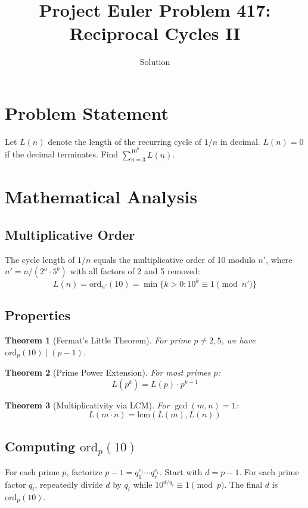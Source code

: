 \documentclass[12pt]{article}
\title{Project Euler Problem 417: Reciprocal Cycles II}
\author{Solution}
\date{}
\newtheorem{theorem}{Theorem}
\theoremstyle{definition}
\begin{document}
\maketitle

\section{Problem Statement}
Let $L(n)$ denote the length of the recurring cycle of $1/n$ in decimal. $L(n) = 0$ if the decimal terminates. Find $\sum_{n=3}^{10^8} L(n)$.

\section{Mathematical Analysis}

\subsection{Multiplicative Order}
The cycle length of $1/n$ equals the multiplicative order of 10 modulo $n'$, where $n' = n / (2^a \cdot 5^b)$ with all factors of 2 and 5 removed:
\[
L(n) = \mathrm{ord}_{n'}(10) = \min\{k > 0 : 10^k \equiv 1 \pmod{n'}\}
\]

\subsection{Properties}
\begin{theorem}[Fermat's Little Theorem]
For prime $p \neq 2, 5$, we have $\mathrm{ord}_p(10) \mid (p-1)$.
\end{theorem}

\begin{theorem}[Prime Power Extension]
For most primes $p$:
\[
L(p^k) = L(p) \cdot p^{k-1}
\]
\end{theorem}

\begin{theorem}[Multiplicativity via LCM]
For $\gcd(m,n) = 1$:
\[
L(m \cdot n) = \mathrm{lcm}(L(m), L(n))
\]
\end{theorem}

\subsection{Computing $\mathrm{ord}_p(10)$}
For each prime $p$, factorize $p-1 = q_1^{e_1} \cdots q_r^{e_r}$. Start with $d = p-1$. For each prime factor $q_i$, repeatedly divide $d$ by $q_i$ while $10^{d/q_i} \equiv 1 \pmod{p}$. The final $d$ is $\mathrm{ord}_p(10)$.
\end{document}
